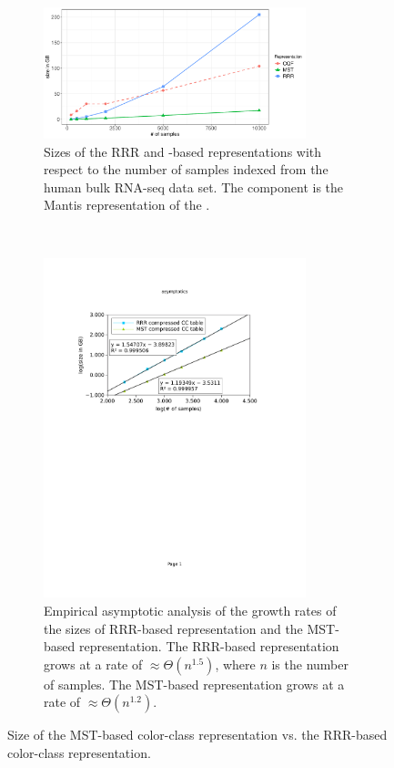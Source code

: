 \begin{figure}[t!]
    \centering
    \begin{subfigure}[t]{3in}
        \includegraphics[width=3in]{figs/mantis/scaling_r2}
        \caption{Sizes of the RRR and \mst-based \cc representations with
        respect to the number of samples indexed from the human bulk RNA-seq data set.
        The \cqf component is the Mantis representation of the \dbg.}
        \label{fig:scaling}
    \end{subfigure}
    ~~~~~~~~~~~
    \begin{subfigure}[t]{3in}
        \includegraphics[width=3in,clip, trim = 1.1in 6in 1.5in 1.75in]{figs/mantis/asymptotics__asymptotics}
        \caption{Empirical asymptotic analysis of the growth rates of the
        sizes of RRR-based \cc representation and the MST-based
        \cc representation.  The RRR-based representation grows
        at a rate of $\approx \Theta(n^{1.5})$, where $n$ is the number of
        samples.  The MST-based representation grows at a rate of
        $\approx\Theta(n^{1.2})$.}
        \label{fig:asymptotics}
        \vspace{.1in}
    \end{subfigure}
    \caption{Size of the MST-based color-class representation vs.
    the RRR-based color-class representation.}
\end{figure}

